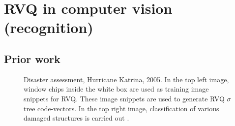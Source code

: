 \chapter{RVQ in computer vision (recognition)}
\label{chap_RVQ_CV_recog}	
%

\section{Prior work}
\label{Sec:RVQ_prior_work}	
\begin{figure}[htp]	
\centering	
{}
\caption{Disaster assessment, Hurricane Katrina, 2005.  In the top left image, window chips inside the white box are used as training image snippets for RVQ.  These image snippets are used to generate RVQ $\sigma$ tree code-vectors.  In the top right image, classification of various damaged structures is carried out \cite{2007_JNL_Katrina_Barnes}.}
\end{figure}

